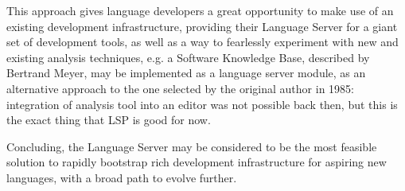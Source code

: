 This approach gives language developers a great opportunity to make use of an
existing development infrastructure, providing their Language Server for a
giant set of development tools, as well as a way to fearlessly experiment with new and
existing analysis techniques, e.g. a Software Knowledge Base\cite{Wanghong}, described by
Bertrand Meyer, may be implemented as a language server module, as an
alternative approach to the one selected by the original author in 1985:
integration of analysis tool into an editor was not possible back then, but this is
the exact thing that LSP is good for now.

Concluding, the Language Server may be considered to be the most feasible
solution to rapidly bootstrap rich development infrastructure for aspiring new
languages, with a broad path to evolve further.